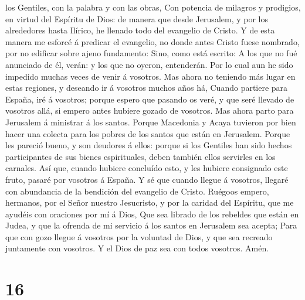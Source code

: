 los Gentiles, con la palabra y con las obras,  Con
potencia de milagros y prodigios, en virtud del Espíritu de Dios: de
manera que desde Jerusalem, y por los alrededores hasta Ilírico, he
llenado todo del evangelio de Cristo.  Y de esta manera
me esforcé á predicar el evangelio, no donde antes Cristo fuese
nombrado, por no edificar sobre ajeno fundamento:  Sino,
como está escrito: A los que no fué anunciado de él, verán: y los que no
oyeron, entenderán.  Por lo cual aun he sido impedido
muchas veces de venir á vosotros.  Mas ahora no teniendo
más lugar en estas regiones, y deseando ir á vosotros muchos años há,
 Cuando partiere para España, iré á vosotros; porque
espero que pasando os veré, y que seré llevado de vosotros allá, si
empero antes hubiere gozado de vosotros.  Mas ahora parto
para Jerusalem á ministrar á los santos.  Porque
Macedonia y Acaya tuvieron por bien hacer una colecta para los pobres de
los santos que están en Jerusalem.  Porque les pareció
bueno, y son deudores á ellos: porque si los Gentiles han sido hechos
participantes de sus bienes espirituales, deben también ellos servirles
en los carnales.  Así que, cuando hubiere concluído esto,
y les hubiere consignado este fruto, pasaré por vosotros á España.
 Y sé que cuando llegue á vosotros, llegaré con
abundancia de la bendición del evangelio de Cristo. 
Ruégoos empero, hermanos, por el Señor nuestro Jesucristo, y por la
caridad del Espíritu, que me ayudéis con oraciones por mí á Dios,
 Que sea librado de los rebeldes que están en Judea, y
que la ofrenda de mi servicio á los santos en Jerusalem sea acepta;
 Para que con gozo llegue á vosotros por la voluntad de
Dios, y que sea recreado juntamente con vosotros.  Y el
Dios de paz sea con todos vosotros. Amén.

\hypertarget{section-15}{%
\section{16}\label{section-15}}

